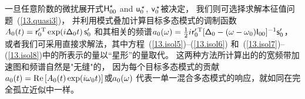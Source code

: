 {{{{%

一旦任意阶数的微扰展开式$\mbox{${\sf H}$}_{00}^{\star}$
and $\ssu_0^{\hspace{0.5 mm}\raisebox{-0.45 ex}
{$\scriptstyle\star$}}$, $\ssv_0^{\hspace{0.5 mm}\raisebox{-0.45 ex}
{$\scriptstyle\star$}}$被决定， 
我们则可选择求解本征值问题~(\ref{13.quasi3})，
并利用模式叠加计算目标多态模式的调制函数$A_0(t)=\mbox{${\sf r}$}_0^{\prime\,{\rm T}}
\exp(i\mbox{${\sf \Delta}$}_0t)\,\mbox{${\sf s}$}_0^{\prime}$
和其相关的频谱$a_0(\mbox{$\omega$})=\mbox{$\frac{1}{2}$} i\hspace{0.1 mm}\mbox{${\sf r}$}_0^{\prime\,{\rm T}}
[\mbox{${\sf \Delta}$}_0-(\mbox{$\omega$}-\mbox{$\omega$}_0)\mbox{${\sf I}$}_{00}]
^{-1}\mbox{${\sf s}$}_0^{\prime}$，
或者我们可采用直接求解法，其中方程~(\ref{13.isol5})--(\ref{13.isol6})
和~(\ref{13.isol7})--(\ref{13.isol8})中的所表示的量以“星形”的量取代。
这两种方法所计算出的的宽频带加速图和频谱自然是"无缝"的，
因为每个目标多态模式的贡献$a_0(t)=\mbox{${\rm R}$}{\rm e}\,[A_0(t)\exp(i\mbox{$\omega$}_0t)]$或$a_0(\mbox{$\omega$})$
代表一单一混合多态模式的响应，就如同在完全孤立近似中一样。

}}}}
